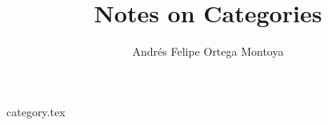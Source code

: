 \documentclass[a4paper, oneside, draft]{book}
\title{Notes on Categories}
\author{Andrés Felipe Ortega Montoya}
\date{}
\begin{document}
\maketitle
\tableofcontents

{category.tex}


\printindex
\printbibliography
\listoftodos
\end{document}
